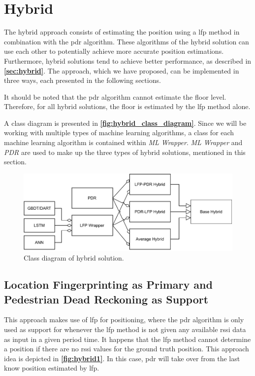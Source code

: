 \section{Hybrid} \label{sec:hybrid_theory}
The hybrid approach consists of estimating the position using a \gls{lfp} method in combination with the \gls{pdr} algorithm. These algorithms of the hybrid solution can use each other to potentially achieve more accurate position estimations. Furthermore, hybrid solutions tend to achieve better performance, as described in \textbf{\autoref{sec:hybrid}}. The approach, which we have proposed, can be implemented in three ways, each presented in the following sections.

It should be noted that the \gls{pdr} algorithm cannot estimate the floor level. Therefore, for all hybrid solutions, the floor is estimated by the \gls{lfp} method alone.

A class diagram is presented in \textbf{\autoref{fig:hybrid_class_diagram}}. Since we will be working with multiple types of machine learning algorithms, a class for each machine learning algorithm is contained within \textit{ML Wrapper}. \textit{ML Wrapper} and \textit{PDR} are used to make up the three types of hybrid solutions, mentioned in this section.

\begin{figure}[H]
    \centering
    \includegraphics[scale=1]{Images/Experiments/hybrid/HybridClassDiagram.pdf}
    \caption{Class diagram of hybrid solution.}
     \label{fig:hybrid_class_diagram}
\end{figure}

\subsection{Location Fingerprinting as Primary and Pedestrian Dead Reckoning as Support}
This approach makes use of \gls{lfp} for positioning, where the \gls{pdr} algorithm is only used as support for whenever the \gls{lfp} method is not given any available \gls{rssi} data as input in a given period time. 
It happens that the \gls{lfp} method cannot determine a position if there are no \gls{rssi} values for the ground truth position. This approach idea is depicted in \textbf{\autoref{fig:hybrid1}}. In this case, \gls{pdr} will take over from the last know position estimated by \gls{lfp}.

